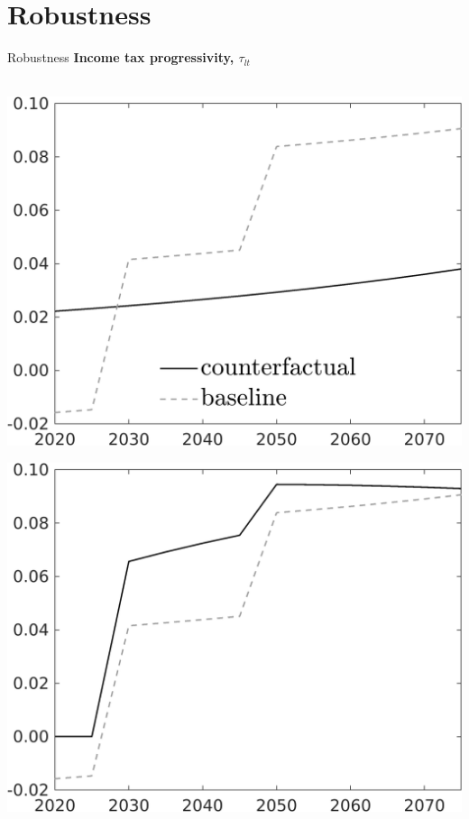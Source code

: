 \documentclass[11pt,aspectratio=169]{beamer}
\begin{document}
\section*{Robustness}
\begin{frame}{Robustness}
	\hypertarget{robustness}{}
	\centering \textbf{Income tax progressivity, $\tau_{lt}$}\\ \ \\
	\begin{minipage}[]{0.3\textwidth}
		\includegraphics[width=1\textwidth]{../codding_model/own_basedOnFried/optimalPol_elastS_DisuSci/figures/all_1705/SingleROB_extern_OPT_T_NoTaus_taul_spillover0_noskill0_sep1_BN0_ineq0_red0_etaa0.79_lgd1.png}
	\end{minipage}
\begin{minipage}[]{0.3\textwidth}
	\includegraphics[width=1\textwidth]{../codding_model/own_basedOnFried/optimalPol_elastS_DisuSci/figures/all_1705/SingleROB_xgrowth_OPT_T_NoTaus_taul_spillover0_noskill0_sep1_BN0_ineq0_red0_etaa0.79_lgd0.png}

\end{minipage}
\end{frame}
\end{document}
